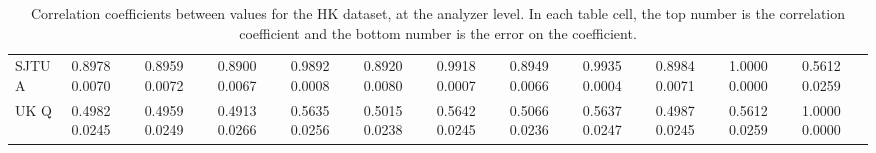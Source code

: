 \begin{landscape}
\begin{table}
\begin{tabularx}{1\linewidth}{@{\extracolsep{\fill}}lXXXXXXXXXXX}
	SJTU A & 0.8978 0.0070 & 0.8959 0.0072 & 0.8900 0.0067 & 0.9892 0.0008 & 0.8920 0.0080 & 0.9918 0.0007 & 0.8949 0.0066 & 0.9935 0.0004 & 0.8984 0.0071 & 1.0000 0.0000 & 0.5612 0.0259  \\
	UK Q   & 0.4982 0.0245 & 0.4959 0.0249 & 0.4913 0.0266 & 0.5635 0.0256 & 0.5015 0.0238 & 0.5642 0.0245 & 0.5066 0.0236 & 0.5637 0.0247 & 0.4987 0.0245 & 0.5612 0.0259 & 1.0000 0.0000  \\
  \bottomrule
\end{tabularx}
\caption[]{Correlation coefficients between \R values for the HK dataset, at the analyzer level. In each table cell, the top number is the correlation coefficient and the bottom number is the error on the coefficient.}
\label{tab:Corrs_HK_analyzer}
\end{table}
\end{landscape}



